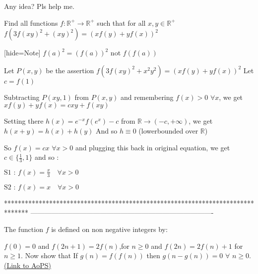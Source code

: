 


\begin{solution}
	Any idea?
Pls help me.
\end{solution}



\begin{solution}
	\begin{tcolorbox}Find all functions $f:\mathbb {R^{+}}\to\mathbb {R^{+}} $ such that for all $x,y\in \mathbb {R^{+}} $
$f (3f (xy)^2+(xy)^2)=(xf (y)+yf (x))^2$

[hide=Note] $f (a)^2=(f (a))^2$ not $f (f (a)) $\end{tcolorbox}
Let $P(x,y)$ be the assertion $f(3f(xy)^2+x^2y^2)=(xf(y)+yf(x))^2$
Let $c=f(1)$

Subtracting $P(xy,1)$ from $P(x,y)$ and remembering $f(x)>0$ $\forall x$, we get 
$xf(y)+yf(x)=cxy+f(xy)$

Setting there $h(x)=e^{-x}f(e^x)-c$ from $\mathbb R\to(-c,+\infty)$, we get $h(x+y)=h(x)+h(y)$ 
And so $h\equiv 0$ (lowerbounded over $\mathbb R$)

So $f(x)=cx$ $\forall x>0$ and plugging this back in original equation, we get $c\in\{\frac 13,1\}$ and so :

$\boxed{\text{S1 : }f(x)=\frac x3\quad\forall x>0}$

$\boxed{\text{S2 : }f(x)=x\quad\forall x>0}$



\end{solution}
*******************************************************************************
-------------------------------------------------------------------------------

\begin{problem}
	The function $f$ is defined on non negative integers by:
  
  $f(0)=0$ and $f(2n+1)=2f(n)$,for $n\geq 0$ and $f(2n)=2f(n)+1$ for $n{\geq} 1.$   
Now show that If $g(n)=f(f(n))$ then $g(n-g(n))=0$ $\forall$ $n{\geq}0.$
	\flushright \href{https://artofproblemsolving.com/community/c6h1611182}{(Link to AoPS)}
\end{problem}



